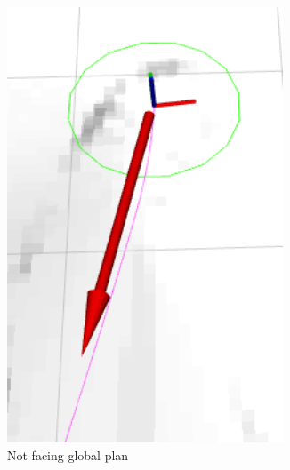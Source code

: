 \documentclass[capstone_report.tex]{subfiles}
\begin{document}
\begin{figure}[H]
    \centering
    \begin{subfigure}{0.5\textwidth}
        \centering
        \includegraphics[width=0.9\textwidth]{imgs/tbm_not_facing_target.png}
        \caption{Not facing global plan}
        \label{fig:tbm_not_heading_towards_global}
    \end{subfigure}%
    \begin{subfigure}{0.5\textwidth}
        \centering

\end{subfigure}
\end{figure}
\end{document}
